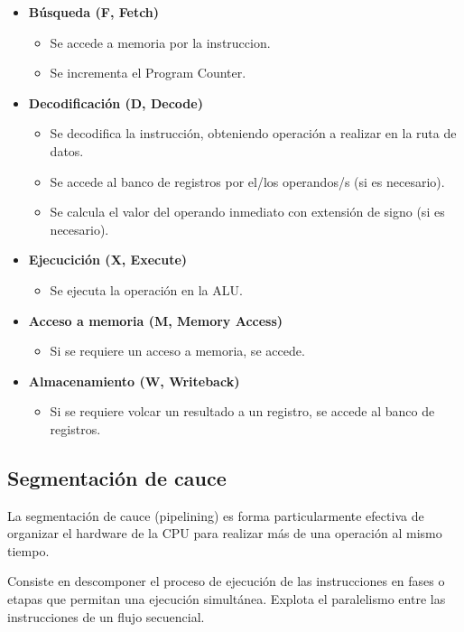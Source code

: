 \begin{itemize}
  \item \textbf{Búsqueda (F, Fetch)}
  \begin{itemize}
    \item Se accede a memoria por la instruccion.
    \item Se incrementa el Program Counter.
  \end{itemize}
  \item \textbf{Decodificación (D, Decode)}
  \begin{itemize}
    \item Se decodifica la instrucción, obteniendo operación a realizar en la ruta de datos.
    \item Se accede al banco de registros por el/los operandos/s (si es necesario).
    \item Se calcula el valor del operando inmediato con extensión de signo (si es necesario).
  \end{itemize}
  \item \textbf{Ejecucición (X, Execute)}
  \begin{itemize}
    \item Se ejecuta la operación en la ALU.
  \end{itemize}
  \item \textbf{Acceso a memoria (M, Memory Access)}
  \begin{itemize}
    \item Si se requiere un acceso a memoria, se accede.
  \end{itemize}
  \item \textbf{Almacenamiento (W, Writeback)}
  \begin{itemize}
    \item Si se requiere volcar un resultado a un registro, se accede al banco de registros.
  \end{itemize}
\end{itemize}

\subsection{Segmentación de cauce}

La segmentación de cauce (pipelining) es forma particularmente efectiva de organizar el hardware de la CPU para realizar más de una operación al mismo tiempo. 

Consiste en descomponer el proceso de ejecución de las instrucciones en fases o etapas que permitan una ejecución simultánea. Explota el paralelismo entre las instrucciones de un flujo secuencial.

